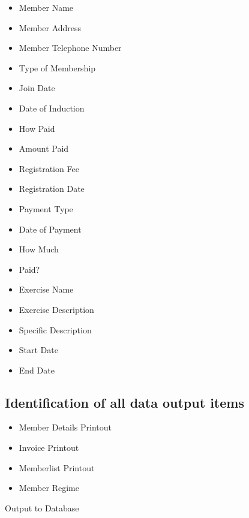 \begin{itemize}
    \item Member Name
    \item Member Address
    \item Member Telephone Number
    \item Type of Membership
    \item Join Date
    \item Date of Induction
    \item How Paid
    \item Amount Paid
    \item Registration Fee
    \item Registration Date
    \item Payment Type
    \item Date of Payment
    \item How Much
    \item Paid?
    \item Exercise Name
    \item Exercise Description
    \item Specific Description
    \item Start Date
    \item End Date
\end{itemize}

\subsection{Identification of all data output items}

\begin{itemize}
    \item Member Details Printout
    \item Invoice Printout
    \item Memberlist Printout
    \item Member Regime
\end{itemize}

Output to Database

